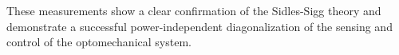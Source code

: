 These measurements show a clear confirmation of the Sidles-Sigg theory
and demonstrate a successful power-independent diagonalization of the
sensing and control of the optomechanical system.













